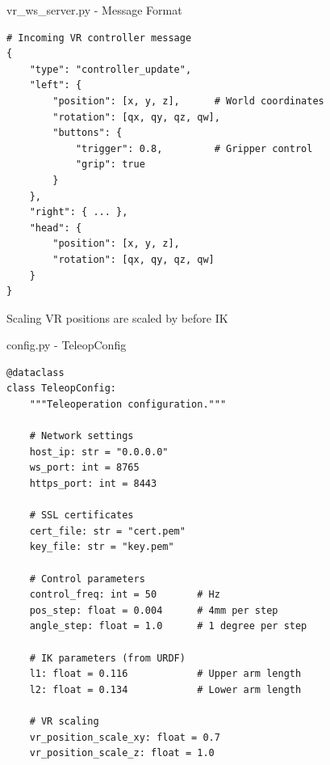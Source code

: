 \begin{frame}[fragile]{vr\_ws\_server.py - Message Format}
\begin{lstlisting}
# Incoming VR controller message
{
    "type": "controller_update",
    "left": {
        "position": [x, y, z],      # World coordinates
        "rotation": [qx, qy, qz, qw],
        "buttons": {
            "trigger": 0.8,         # Gripper control
            "grip": true
        }
    },
    "right": { ... },
    "head": {
        "position": [x, y, z],
        "rotation": [qx, qy, qz, qw]
    }
}
\end{lstlisting}

\begin{block}{Scaling}
VR positions are scaled by  before IK
\end{block}
\end{frame}

\begin{frame}[fragile,shrink=3]{config.py - TeleopConfig}
\begin{lstlisting}
@dataclass
class TeleopConfig:
    """Teleoperation configuration."""

    # Network settings
    host_ip: str = "0.0.0.0"
    ws_port: int = 8765
    https_port: int = 8443

    # SSL certificates
    cert_file: str = "cert.pem"
    key_file: str = "key.pem"

    # Control parameters
    control_freq: int = 50       # Hz
    pos_step: float = 0.004      # 4mm per step
    angle_step: float = 1.0      # 1 degree per step

    # IK parameters (from URDF)
    l1: float = 0.116            # Upper arm length
    l2: float = 0.134            # Lower arm length

    # VR scaling
    vr_position_scale_xy: float = 0.7
    vr_position_scale_z: float = 1.0
\end{lstlisting}
\end{frame}

